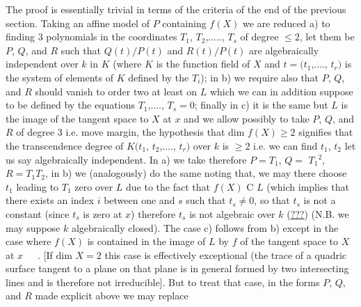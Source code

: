 
The proof is essentially trivial in terms of the criteria of
the end of the previous section. Taking an affine model of $P$
containing $f(X)$ we are reduced a) to finding 3 polynomials in the
coordinates $T_1$, $T_2$,....., $T_s$ of degree $\leq 2$, let them be $P$, $Q$, and $R$
such that $Q(t)/P(t)$ and $R(t)/P(t)$ are algebraically independent
over $k$ in $K$ (where $K$ is the function field of $X$ and $t = (t_1$,....,
$t_r)$ is the system of elements of $K$ defined by the $T_i$); in b) we
require also that $P$, $Q$, and $R$ should vanish to order two at least
on $L$ which we can in addition suppose to be defined by the
equations $T_1$,...., $T_s = 0$; finally in c) it is the same but $L$ is
the image of the tangent space to $X$ at $x$ and we allow possibly to
take $P$, $Q$, and $R$ of degree 3 i.e. move margin, the hypothesis that
dim $f(X) \geq 2$ signifies that the transcendence degree of $K(t_1$,
$t_2$,...., $t_r)$ over $k$ is $\geq 2$ i.e. we can find $t_1$, $t_2$ let us say
algebraically independent. In a) we take therefore $P = T_1$, $Q =$
$T_1{}^2$, $R = T_1T_2$, in b) we (analogously) do the same noting that, we
may there choose $t_1$ leading to $T_1$ zero over $L$ due to the fact that
$f(X)$ C $L$ (which implies that there exists an index $i$ between one
and $s$ such that $t_s \neq 0$, so that $t_s$ is not a constant (since $t_s$ is
zero at $x$) therefore $t_s$ is not algebraic over $k$ (\uline{???}) (N.B. we may
suppose $k$ algebraically closed). The case c) follows from b)
except in the case where $f(X)$ is contained in the image of $L$ by $f$
of the tangent space to $X$ at $x$\ \ \ . [If dim $X = 2$ this case is
effectively exceptional (the trace of a quadric surface tangent to
a plane on that plane is in general formed by two intersecting
lines and is therefore not irreducible]. But to treat that case,
in the forms $P$, $Q$, and $R$ made explicit above we may replace
